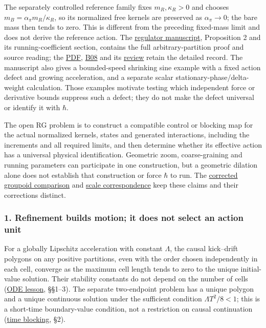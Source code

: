 \documentclass[11pt,a4paper]{article}
\begin{document}
The separately controlled reference family fixes \(m_R,\kappa_R>0\) and
chooses \(m_B=\alpha_\pi m_R/\kappa_R\), so its normalized free kernels
are preserved as \(\alpha_\pi\to0\); the bare mass then tends to zero.
This is different from the preceding fixed-mass limit and does not
derive the reference action. The
\href{../papers/regulator-limits.tex}{regulator manuscript}, Proposition
2 and its running-coefficient section, contains the full
arbitrary-partition proof and source reading; the
\href{../out/papers/regulator-limits.pdf}{PDF},
\href{../references/batches/B08.md}{B08} and its
\href{../reviews/regulator-limits-B08.md}{review} retain the detailed
record. The manuscript also gives a bounded-speed shrinking sine example
with a fixed action defect and growing acceleration, and a separate
scalar stationary-phase/delta-weight calculation. Those examples
motivate testing which independent force or derivative bounds suppress
such a defect; they do not make the defect universal or identify it with
\(\hbar\).

The open RG problem is to construct a compatible control or blocking map
for the actual normalized kernels, states and generated interactions,
including the increments and all required limits, and then determine
whether its effective action has a universal physical identification.
Geometric zoom, coarse-graining and running parameters can participate
in one construction, but a geometric dilation alone does not establish
that construction or force \(\hbar\) to run. The
\href{tangent-groupoid-trajectories.md}{corrected groupoid comparison}
and \href{../research/refinement-correspondences.md}{scale
correspondence} keep these claims and their corrections distinct.

\hypertarget{refinement-builds-motion-it-does-not-select-an-action-unit}{%
\subsubsection{1. Refinement builds motion; it does not select an action
unit}\label{refinement-builds-motion-it-does-not-select-an-action-unit}}

For a globally Lipschitz acceleration with constant \(\Lambda\), the
causal kick--drift polygons on any positive partitions, even with the
order chosen independently in each cell, converge as the maximum cell
length tends to zero to the unique initial-value solution. Their
stability constants do not depend on the number of cells
(\href{balaban-ode-lesson.md}{ODE lesson}, §§1--3). The separate
two-endpoint problem has a unique polygon and a unique continuous
solution under the sufficient condition \(\Lambda T^2/8<1\); this is a
short-time boundary-value condition, not a restriction on causal
continuation (\href{balaban-newton-time-blocking.md}{time blocking},
§2).
\end{document}
